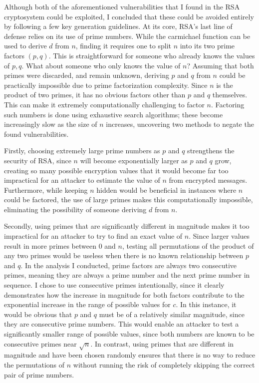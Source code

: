 Although both of the aforementioned vulnerabilities that I found in the RSA cryptosystem could be exploited, I concluded that these could be avoided entirely by following a few key generation guidelines. At its core, RSA’s last line of defense relies on its use of prime numbers. While the carmichael function can be used to derive $d$ from $n$, finding it requires one to split $n$ into its two prime factors $(p,q)$. This is straightforward for someone who already knows the values of $p, q$. What about someone who only knows the value of $n$? Assuming that both primes were discarded, and remain unknown, deriving $p$ and $q$ from $n$ could be practically impossible due to prime factorization complexity. Since $n$ is the product of two primes, it has no obvious factors other than $p$ and $q$ themselves. This can make it extremely computationally challenging to factor $n$. Factoring such numbers is done using exhaustive search algorithms; these become increasingly slow as the size of $n$ increases, uncovering two methods to negate the found vulnerabilities.

Firstly, choosing extremely large prime numbers as $p$ and $q$ strengthens the security of RSA, since $n$ will become exponentially larger as $p$ and $q$ grow, creating so many possible encryption values that it would become far too impractical for an attacker to estimate the value of $n$ from encrypted messages. Furthermore, while keeping $n$ hidden would be beneficial in instances where $n$ could be factored, the use of large primes makes this computationally impossible, eliminating the possibility of someone deriving $d$ from $n$.

Secondly, using primes that are significantly different in magnitude makes it too impractical for an attacker to try to find an exact value of $n$. Since larger values result in more primes between $0$ and $n$, testing all permutations of the product of any two primes would be useless when there is no known relationship between $p$ and $q$. In the analysis I conducted, prime factors are always two consecutive primes, meaning they are always a prime number and the next prime number in sequence. I chose to use consecutive primes intentionally, since it clearly demonstrates how the increase in magnitude for both factors contribute to the exponential increase in the range of possible values for $c$. In this instance, it would be obvious that $p$ and $q$ must be of a relatively similar magnitude, since they are consecutive prime numbers. This would enable an attacker to test a significantly smaller range of possible values, since both numbers are known to be consecutive primes near $\sqrt{n}$. In contrast, using primes that are different in magnitude and have been chosen randomly ensures that there is no way to reduce the permutations of $n$ without running the risk of completely skipping the correct pair of prime numbers.